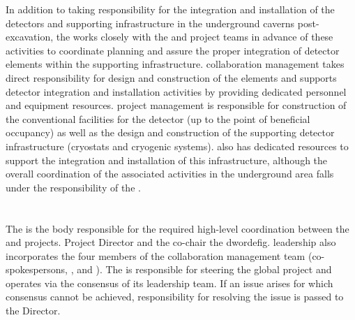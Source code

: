 In addition to taking responsibility for the integration and
installation of the detectors and supporting 
infrastructure in the underground caverns post-excavation, the
 works closely with the  and 
project teams in advance of these activities to coordinate planning
and assure the proper integration of detector elements within the
supporting infrastructure.   collaboration management
takes direct responsibility for design and construction of the  
 elements and supports detector integration and installation
activities by providing dedicated personnel and equipment resources.
 project management is responsible for construction of the
conventional  facilities for the detector (up to the point of beneficial  %
occupancy) as well as the design and construction of the supporting
detector infrastructure (cryostats and cryogenic systems).  also
has dedicated resources to support the integration and installation of
this infrastructure, although the overall coordination of the
associated activities in the underground area falls under the
responsibility of the .

\section{}
\label{sec:efig}

The  is the body responsible for the required high-level
coordination between the  and  projects.  
  Project Director and
the  co-chair the dword{efig}.   leadership also incorporates the four
members of the  collaboration management team
(co-spokespersons, , and ).  The
 is responsible for steering the global project and
operates via the consensus of its leadership team.  If an issue arises
for which consensus cannot be achieved, responsibility for resolving
the issue is passed to the  Director.

\section{}
\label{sec:jpo}

